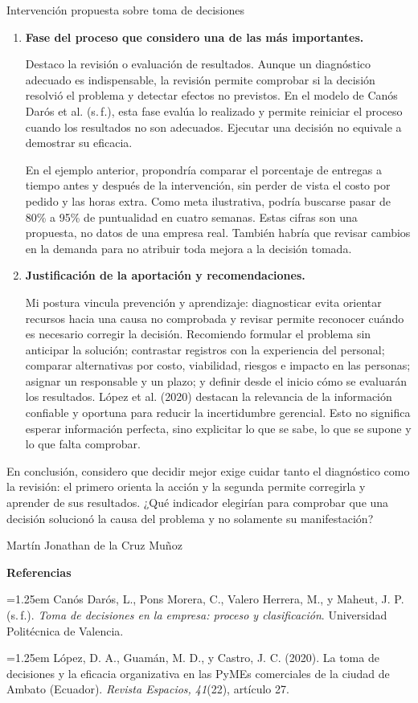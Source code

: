 \documentclass[11pt,letterpaper,oneside]{article}
\newcommand{\fororef}[1]{\par\begingroup\small\hangindent=1.25em\hangafter=1 #1\par\endgroup}
\begin{document}
\begin{forobox}{Intervención propuesta sobre toma de decisiones}
\begin{enumerate}[leftmargin=1.5em,label=\textbf{\arabic*.},itemsep=.6em]
\item \textbf{Fase del proceso que considero una de las más importantes.}

Destaco la revisión o evaluación de resultados. Aunque un diagnóstico adecuado
es indispensable, la revisión permite
comprobar si la decisión resolvió el problema y detectar efectos no previstos. En
el modelo de Canós Darós et al. (s.\,f.), esta fase evalúa lo realizado y
permite reiniciar el proceso cuando los resultados no son adecuados. Ejecutar una
decisión no equivale a demostrar su eficacia.

En el ejemplo anterior, propondría comparar el porcentaje de entregas a tiempo
antes y después de la intervención, sin perder de vista el costo por pedido y las
horas extra. Como meta ilustrativa, podría buscarse pasar de 80\% a 95\% de
puntualidad en cuatro semanas. Estas cifras son una propuesta, no datos de una
empresa real. También habría que revisar cambios en la demanda para no atribuir
toda mejora a la decisión tomada.

\item \textbf{Justificación de la aportación y recomendaciones.}

Mi postura vincula prevención y aprendizaje: diagnosticar evita orientar recursos
hacia una causa no comprobada y revisar permite reconocer cuándo es necesario
corregir la decisión. Recomiendo formular el problema sin anticipar la solución;
contrastar registros con la experiencia del personal; comparar alternativas por
costo, viabilidad, riesgos e impacto en las personas; asignar un responsable y un
plazo; y definir desde el inicio cómo se evaluarán los resultados. López et al.
(2020) destacan la relevancia de la información confiable y oportuna para
reducir la incertidumbre gerencial. Esto no significa esperar información perfecta,
sino explicitar lo que se sabe, lo que se supone y lo que falta comprobar.
\end{enumerate}

En conclusión, considero que decidir mejor exige cuidar tanto el diagnóstico como
la revisión: el primero orienta la acción y la segunda permite corregirla y aprender
de sus resultados. ¿Qué indicador elegirían para comprobar que una decisión
solucionó la causa del problema y no solamente su manifestación?

Martín Jonathan de la Cruz Muñoz

\textbf{Referencias}
\fororef{Canós Darós, L., Pons Morera, C., Valero Herrera, M., y Maheut, J. P. (s.\,f.).
  \textit{Toma de decisiones en la empresa: proceso y clasificación}.
  Universidad Politécnica de Valencia.}
\fororef{López, D. A., Guamán, M. D., y Castro, J. C. (2020).
  La toma de decisiones y la eficacia organizativa en las PyMEs comerciales de la
  ciudad de Ambato (Ecuador). \textit{Revista Espacios, 41}(22), artículo 27.}
\end{forobox}
\end{document}
